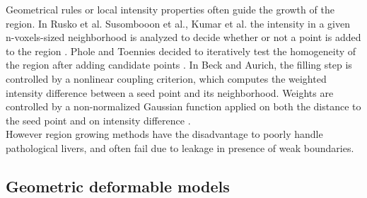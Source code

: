 \documentclass[]{article}
\begin{document}
Geometrical rules or local intensity properties often guide the growth
of the region. In Rusko et al. Susombooon et al., Kumar et al. the intensity in a given n-voxels-sized neighborhood is analyzed
to decide whether or not a point is added to the region \cite{Rusko2007, Susomboon2007, Kumar2013}. 
Phole and Toennies decided to iteratively test the homogeneity of the
region after adding candidate points \cite{Pohle2001}
. In Beck and Aurich, the filling step is controlled by a nonlinear
coupling criterion, which computes the weighted intensity difference
between a seed point and its neighborhood. Weights are controlled by a
non-normalized Gaussian function applied on both the distance to the
seed point and on intensity difference \cite{Beck2007}.\\
However region growing methods have the disadvantage to poorly handle
pathological livers, and often fail due to leakage in presence of weak
boundaries.


\subsection*{Geometric deformable models}
\end{document}
